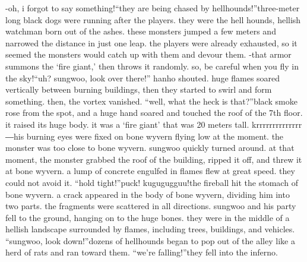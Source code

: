 -oh, i forgot to say something!“they are being chased by hellhounds!”three-meter long black dogs were running after the players.
they were the hell hounds, hellish watchman born out of the ashes.
 these monsters jumped a few meters and narrowed the distance in just one leap.
 the players were already exhausted, so it seemed the monsters would catch up with them and devour them.
-that armor summons the ‘fire giant,’ then throws it randomly.
 so, be careful when you fly in the sky!“uh? sungwoo, look over there!” hanho shouted.
huge flames soared vertically between burning buildings, then they started to swirl and form something.
 then, the vortex vanished.
“well, what the heck is that?”black smoke rose from the spot, and a huge hand soared and touched the roof of the 7th floor.
 it raised its huge body.
 it was a ‘fire giant’ that was 20 meters tall.
krrrrrrrrrrrrrr ―his burning eyes were fixed on bone wyvern flying low at the moment.
 the monster was too close to bone wyvern.
 sungwoo quickly turned around.
at that moment, the monster grabbed the roof of the building, ripped it off, and threw it at bone wyvern.
 a lump of concrete engulfed in flames flew at great speed.
they could not avoid it.
“hold tight!”puck! kugugugguu!the fireball hit the stomach of bone wyvern.
 a crack appeared in the body of bone wyvern, dividing him into two parts.
 the fragments were scattered in all directions.
sungwoo and his party fell to the ground, hanging on to the huge bones.
 they were in the middle of a hellish landscape surrounded by flames, including trees, buildings, and vehicles.
“sungwoo, look down!”dozens of hellhounds began to pop out of the alley like a herd of rats and ran toward them.
“we’re falling!”they fell into the inferno.


 